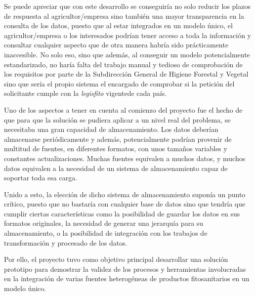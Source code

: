 Se puede apreciar que con este desarrollo se conseguiría no solo reducir los plazos de respuesta al agricultor/empresa sino también una mayor transparencia en la consulta de los datos, puesto que al estar integrados en un modelo único, el agricultor/empresa o los interesados podrían tener acceso a toda la información y consultar cualquier aspecto que de otra manera habría sido prácticamente inaccesible. No solo eso, sino que además, al conseguir un modelo potencialmente estandarizado, no haría falta del trabajo manual y tedioso de comprobación de los requisitos por parte de la Subdirección General de Higiene Forestal y Vegetal sino que sería el propio sistema el encargado de comprobar si la petición del solicitante cumple con la \textit{\gls{legisfito}} vigentede cada país. \par
Uno de los aspectos a tener en cuenta al comienzo del proyecto fue el hecho de que para que la solución se pudiera aplicar a un nivel real del problema, se necesitaba una gran capacidad de almacenamiento. Los datos deberían almacenarse periódicamente y además, potencialmente podrían provenir de multitud de fuentes, en diferentes formatos, con unos tamaños variables y constantes actualizaciones. Muchas fuentes equivalen a muchos datos, y muchos datos equivalen a la necesidad de un sistema de almacenamiento capaz de soportar toda esa carga. 
\par
Unido a esto, la elección de dicho sistema de almacenamiento suponía un punto crítico, puesto que no bastaría con cualquier base de datos sino que tendría que cumplir ciertas características como la posibilidad de guardar los datos en sus formatos originales, la necesidad de generar una jerarquía para su almacenamiento, o la posibilidad de integración con los trabajos de transformación y procesado de los datos. 
\par
Por ello, el proyecto tuvo como objetivo principal desarrollar una solución prototipo para demostrar la validez de los procesos y herramientas involucradas en la integración de varias fuentes heterogéneas de productos fitosanitarios en un modelo único.

